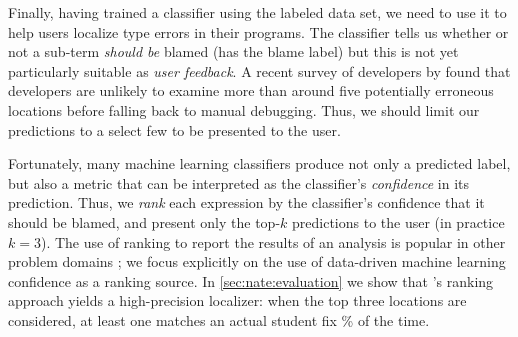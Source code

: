 


Finally, having trained a classifier
using the labeled data set, we need to use
it to help users localize type errors in
their programs.
%
The classifier tells us whether or not
a sub-term \emph{should be}
blamed (\ie has the blame label) but this
is not yet particularly suitable as
\emph{user feedback}.
%
A recent survey of developers by
\citet{Kochhar2016-oc} found that
developers are unlikely to examine
more than around five potentially
erroneous locations before falling
back to manual debugging.
%
Thus, we should limit our predictions
to a select few to be presented to
the user.

%
Fortunately, many machine learning
classifiers produce not only a predicted
label, but also a metric that can be
interpreted as the classifier's
\emph{confidence} in its prediction.
%
Thus, we \emph{rank} each expression
by the classifier's confidence that
it should be blamed, and present only
the top-$k$ predictions to the
user (in practice $k=3$).
%
The use of ranking to report the
results of an analysis is
popular in other problem domains
\citep[see, \eg][]{Kremenek2003-ck};
we focus explicitly on the use of
data-driven machine learning
confidence as a ranking source.
%
In \autoref{sec:nate:evaluation} we show
that \toolname's ranking approach
yields a high-precision localizer:
when the top three locations are considered,
at least one matches an actual student fix
\HiddenFhTopThree\% of the time.




